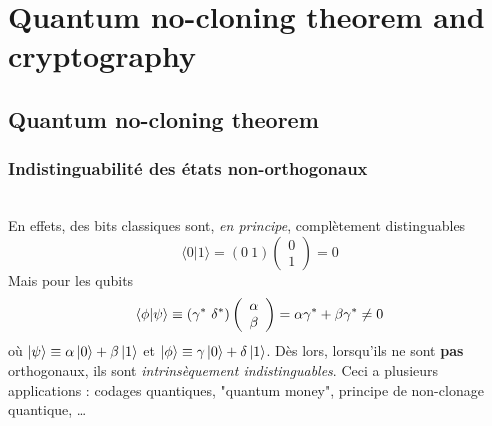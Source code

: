 \chapter{Quantum no-cloning theorem and cryptography}
\section{Quantum no-cloning theorem}
\subsection{Indistinguabilité des états non-orthogonaux}
\ \\

En effets, des bits classiques sont, \textit{en principe}, complètement distinguables
\begin{equation}
\langle0|1\rangle =(0\ 1)\left(\begin{array}{c}
0\\
1
\end{array}\right) = 0
\end{equation}
Mais pour les qubits
\begin{equation}
\bra{\phi}\ket{\psi} \equiv (\gamma^*\ \delta^*)\left(\begin{array}{c}
\alpha\\
\beta
\end{array}\right) = \alpha\gamma^*+\beta\gamma^*\neq0
\end{equation}
où $\ket\psi \equiv \alpha\ket0+\beta\ket1$ et $\ket\phi\equiv\gamma\ket0+\delta\ket1$. Dès lors,
lorsqu'ils ne sont \textbf{pas} orthogonaux, ils sont \textit{intrinsèquement indistinguables}. Ceci
a plusieurs applications : codages quantiques, "quantum money", principe de non-clonage quantique, \dots

